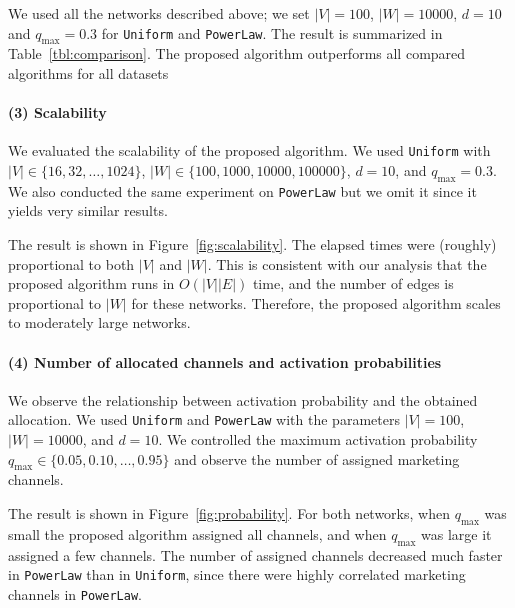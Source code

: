 \documentclass[letterpaper]{article}
\theoremstyle{definition}
\begin{document}
We used all the networks described above; we set $|V| = 100$, $|W| = 10000$, $d = 10$ and $q_{\text{max}} = 0.3$ for \texttt{Uniform} and \texttt{PowerLaw}.
The result is summarized in Table~\ref{tbl:comparison}.
The proposed algorithm outperforms all compared algorithms for all datasets


\paragraph{(3) Scalability}

We evaluated the scalability of the proposed algorithm.
We used \texttt{Uniform} with $|V| \in \{16, 32, \ldots, 1024\}$, $|W| \in \{100, 1000, 10000, 100000\}$, $d = 10$, and $q_{\text{max}} = 0.3$.
We also conducted the same experiment on \texttt{PowerLaw} but we omit it since it yields very similar results.

The result is shown in Figure~\ref{fig:scalability}.
The elapsed times were (roughly) proportional to both $|V|$ and $|W|$.
This is consistent with our analysis that the proposed algorithm runs in $O(|V| |E|)$ time, and the number of edges is proportional to $|W|$ for these networks.
Therefore, the proposed algorithm scales to moderately large networks.

\paragraph{(4) Number of allocated channels and activation probabilities}

We observe the relationship between activation probability and the obtained allocation.
We used \texttt{Uniform} and \texttt{PowerLaw} with the parameters $|V| = 100$,  $|W| = 10000$, and $d = 10$.
We controlled the maximum activation probability $q_{\text{max}} \in \{0.05, 0.10, \ldots, 0.95\}$ and observe the number of assigned marketing channels.

The result is shown in Figure~\ref{fig:probability}.
For both networks, when $q_{\text{max}}$ was small the proposed algorithm assigned all channels, and when $q_{\text{max}}$ was large it assigned a few channels.
The number of assigned channels decreased much faster in \texttt{PowerLaw} than in \texttt{Uniform}, since there were highly correlated marketing channels in \texttt{PowerLaw}.
\end{document}
